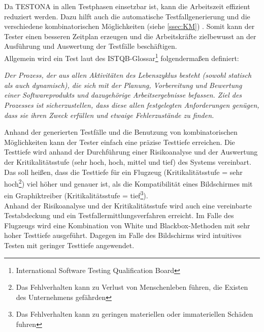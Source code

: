 Da TESTONA in allen Testphasen einsetzbar ist, kann die Arbeitszeit effizient reduziert werden. Dazu hilft auch die automatische Testfallgenerierung und die verschiedene kombinatorischen Möglichkeiten (siehe \ref{ssec:KM}) . Somit kann der Tester einen besseren Zeitplan erzeugen und die Arbeitskräfte zielbewusst an der Ausführung und Auswertung der Testfälle beschäftigen.\\

Allgemein wird ein Test laut des ISTQB-Glossar\footnote{International Software Testing Qualification Board} folgendermaßen definiert:

\begin{center}
\textit{
Der Prozess, der aus allen Aktivitäten des Lebenszyklus besteht (sowohl statisch als auch dynamisch), die sich mit der Planung, Vorbereitung und Bewertung einer Softwareprodukts und dazugehörige Arbeitsergebnisse befassen. Ziel des Prozesses ist sicherzustellen, dass diese allen festgelegten Anforderungen genügen, dass sie ihren Zweck erfüllen und etwaige Fehlerzustände zu finden.}\cite{SoftwareTestEmbSys}\\

\end{center}

Anhand der generierten Testfälle und die Benutzung von kombinatorischen Möglichkeiten kann der Tester einfach eine präzise Testtiefe erreichen. Die Testtiefe wird anhand der Durchführung einer Risikoanalyse und der Auswertung der Kritikalitätsstufe (sehr hoch, hoch, mittel und tief) des Systems vereinbart. Das soll heißen, dass die Testtiefe für ein Flugzeug (Kritikalitätsstufe = sehr hoch\footnote{Das Fehlverhalten kann zu Verlust von Menschenleben führen, die Existen des Unternehmens gefährden}) viel höher und genauer ist, als die Kompatibilität eines Bildschirmes mit ein Graphiktreiber (Kritikalitätsstufe = tief\footnote{Das Fehlverhalten kann zu geringen materiellen oder immateriellen Schäden fuhren}).\\

Anhand der Risikoanalyse und der Kritikalitätsstufe wird auch eine vereinbarte Testabdeckung und ein Testfallermittlungsverfahren erreicht. Im Falle des Flugzeugs wird eine Kombination von White und Blackbox-Methoden mit sehr hoher Testtiefe ausgeführt. Dagegen im Falle des Bildschirms wird intuitives Testen mit geringer Testtiefe angewendet.\cite{ApplicationEngineering}

